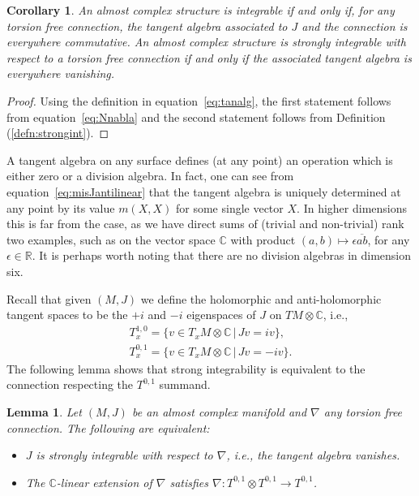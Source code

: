 \documentclass[11pt]{article}
\newtheorem{cor}[thm]{Corollary}
\newtheorem{lem}[thm]{Lemma}
\numberwithin{equation}{section}
\newcommand{\R}{\mathbb{R}}
\newcommand{\CC}{\mathbb{C}}
\begin{document}
\begin{cor} \label{cor:Jintcomm}
 An almost complex structure is integrable if and only if, for any torsion free connection, the tangent algebra associated to $J$ and the connection is \emph{everywhere commutative}. An almost complex structure is strongly integrable with respect to a torsion free connection if and only if the associated tangent algebra is \emph{everywhere vanishing}.
 \end{cor}

 \begin{proof}Using the definition in equation~\eqref{eq:tanalg}, the first statement follows from equation~\eqref{eq:Nnabla} and the second
statement follows from Definition (\ref{defn:strongint}).
 \end{proof}

\begin{rmk}A tangent algebra on any surface defines (at any point) an operation which is either zero or a division algebra. In fact, one can see from equation~\eqref{eq:misJantilinear} that the tangent algebra is uniquely determined at any point by its value $m(X,X)$ for some single vector $X$. In higher dimensions this is far from the case, as we have direct sums of (trivial and non-trivial) rank two examples, such as on the vector space $\CC$ with product $(a,b) \mapsto \epsilon \overline{ab}$, for any $\epsilon \in \R$. It is perhaps worth noting that there are no division algebras in dimension six.
\end{rmk}

Recall that given $(M,J)$ we define the holomorphic and anti-holomorphic tangent spaces to be the $+i$ and $-i$ eigenspaces of $J$ on $TM \otimes \CC$, i.e.,
\begin{gather*}
T^{1,0}_x = \{ v \in T_xM \otimes \CC \,| \, Jv = i v\}, \\
T^{0,1}_x = \{ v \in T_xM \otimes \CC\, | \, Jv = - i v\}.
\end{gather*}
The following lemma shows that strong integrability is equivalent to the connection respecting the $T^{0,1}$ summand.

\begin{lem} \label{lem:strongintequiv}
Let $(M,J)$ be an almost complex manifold and $\nabla$ any torsion free connection. The following are equivalent:
\begin{itemize}\itemsep=0pt
\item $J$ is strongly integrable with respect to $\nabla$, i.e., the tangent algebra vanishes.
\item The $\CC$-linear extension of $\nabla$ satisfies $\nabla\colon T^{0,1} \otimes T^{0,1} \to T^{0,1}$.
\end{itemize}
\end{lem}
\end{document}
